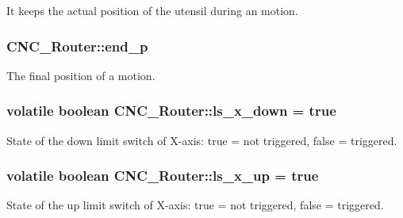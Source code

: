 It keeps the actual position of the utensil during an motion. 

\hypertarget{class_c_n_c___router_a025944e9009cd9b63b6105c41f4665c3}{
\subsubsection[{end\+\_\+p}]{ C\+N\+C\+\_\+\+Router\+::end\+\_\+p\hspace{0.3cm}{\ttfamily [private]}}}\label{class_c_n_c___router_a025944e9009cd9b63b6105c41f4665c3}


The final position of a motion. 

\hypertarget{class_c_n_c___router_ac4dbdb689d5b4bb2ed39af36ec07d394}{
\subsubsection[{ls\+\_\+x\+\_\+down}]{\setlength{\rightskip}{0pt plus 5cm}volatile boolean C\+N\+C\+\_\+\+Router\+::ls\+\_\+x\+\_\+down = true\hspace{0.3cm}{\ttfamily [static]}}}\label{class_c_n_c___router_ac4dbdb689d5b4bb2ed39af36ec07d394}


State of the down limit switch of X-\/axis\+: true = not triggered, false = triggered. 

\hypertarget{class_c_n_c___router_a63dab669f0dd34b0306c16b61816e751}{
\subsubsection[{ls\+\_\+x\+\_\+up}]{\setlength{\rightskip}{0pt plus 5cm}volatile boolean C\+N\+C\+\_\+\+Router\+::ls\+\_\+x\+\_\+up = true\hspace{0.3cm}{\ttfamily [static]}}}\label{class_c_n_c___router_a63dab669f0dd34b0306c16b61816e751}


State of the up limit switch of X-\/axis\+: true = not triggered, false = triggered. 


